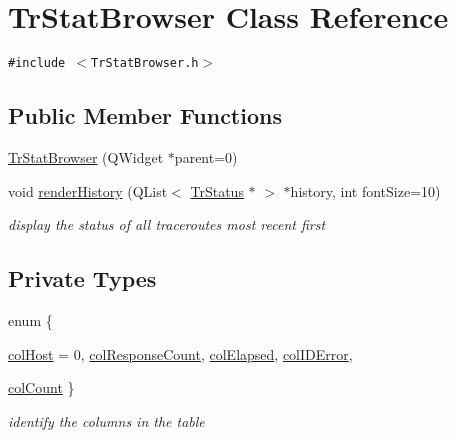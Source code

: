 \hypertarget{classTrStatBrowser}{
\section{TrStatBrowser Class Reference}
\label{classTrStatBrowser}
}
{\tt \#include $<$TrStatBrowser.h$>$}

\subsection*{Public Member Functions}
\begin{CompactItemize}
\item 
\hyperlink{classTrStatBrowser_e7430d311eb6ee13d5e4d75a4f21d29b}{TrStatBrowser} (QWidget $\ast$parent=0)
\item 
void \hyperlink{classTrStatBrowser_55228e4f43413c06cd97a8d1fb36f074}{renderHistory} (QList$<$ \hyperlink{classTrStatus}{TrStatus} $\ast$ $>$ $\ast$history, int fontSize=10)
\begin{CompactList}\small\item\em display the status of all traceroutes most recent first \item\end{CompactList}\end{CompactItemize}
\subsection*{Private Types}
\begin{CompactItemize}
\item 
enum \{ \par
\hyperlink{classTrStatBrowser_fcbf6150a14800fac3d2f871b5e86034a9941816e8e9c7a678d1426435f6a25b}{colHost} = 0, 
\hyperlink{classTrStatBrowser_fcbf6150a14800fac3d2f871b5e860348d8e0b7336131317fef3a3c9491f44d0}{colResponseCount}, 
\hyperlink{classTrStatBrowser_fcbf6150a14800fac3d2f871b5e860346d7cfac00f81b94e568c5bee25de1837}{colElapsed}, 
\hyperlink{classTrStatBrowser_fcbf6150a14800fac3d2f871b5e8603457c5654c2085e8c7ee16a30019a42867}{colIDError}, 
\par
\hyperlink{classTrStatBrowser_fcbf6150a14800fac3d2f871b5e86034fee47e115d2774799f334a7e2bbc5ea6}{colCount}
 \}
\begin{CompactList}\small\item\em identify the columns in the table \item\end{CompactList}\end{CompactItemize}
